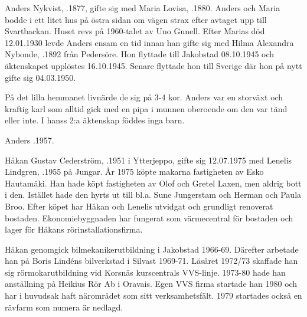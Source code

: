 
Anders Nykvist, .1877, gifte sig med Maria Lovisa, .1880. Anders och Maria bodde i ett litet hus på östra sidan om vägen strax efter avtaget upp till Svartbackan. Huset revs på 1960-talet av Uno Gunell. Efter Marias död 12.01.1930 levde Anders ensam en tid innan han gifte sig med Hilma Alexandra Nybonde, .1892 från Pedersöre. Hon flyttade till Jakobstad 08.10.1945 och äktenskapet upplöstes 16.10.1945. Senare flyttade hon till Sverige där hon på nytt gifte sig 04.03.1950.

På det lilla hemmanet livnärde de sig på 3-4 kor. Anders var en storväxt och kraftig karl som alltid gick med en pipa i munnen oberoende om den var tänd eller inte. I hanss 2:a äktenskap föddes inga barn.
\begin{jhchildren}
  \item {}
  \item {}
  \item {}
  \item {}
  \item {}
  \item {}
\end{jhchildren}
Anders .1957.




Håkan Gustav Cederström, .1951 i Ytterjeppo, gifte sig 12.07.1975 med Lenelis Lindgren, .1955 på Jungar. År 1975 köpte makarna fastigheten av Esko Hautamäki. Han hade köpt fastigheten av Olof och Gretel Laxen, men aldrig bott i den. Istället hade den hyrts ut till bl.a. Sune Jungerstam och Herman och Paula Broo. Efter köpet har Håkan och Lenelis utvidgat och grundligt renoverat bostaden. Ekonomiebyggnaden har fungerat som värmecentral för bostaden och lager för Håkans rörinstallationsfirma.

Håkan genomgick bilmekanikerutbildning i Jakobstad 1966-69. Därefter arbetade han på Boris Lindéns bilverkstad i Silvast 1969-71. Läsåret 1972/73 skaffade han sig rörmokarutbildning vid Korsnäs kurscentrals VVS-linje. 1973-80 hade han anställning på Heikius Rör Ab i Oravais. Egen VVS firma startade han 1980 och har i huvudsak haft närområdet som sitt verksamhetsfält. 1979 startades också en rävfarm som numera är nedlagd.

